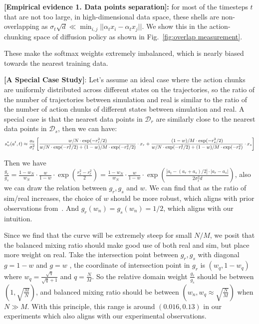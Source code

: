 \textbf{[Empirical evidence 1. Data points separation]:}
for most of the timesteps $t$ that are not too large, in high-dimensional data space,
these shells are non-overlapping as $\sigma_t\sqrt{d} \ll \min_{i,j} ||\alpha_t x_i - \alpha_t x_j||$.
We show this in the action-chunking space of diffusion policy as shown in Fig.~\ref{fig:overlap measurement}.

These make the softmax weights extremely imbalanced, which is nearly biased towards the nearest training data.

\textbf{[A Special Case Study]}: Let's assume an ideal case where the action chunks are uniformly distributed across different states on the trajectories, so the ratio of the number of trajectories between simulation and real is similar to the ratio of the number of action chunks of different states between simulation and real.  A special case is that the nearest data points in $\mathcal{D}_r$ are similarly close to the nearest data points in $\mathcal{D}_s$, then we can have:
\begin{equation}
\small
\begin{aligned}
    s_w^*(a^t, t) \approx \frac{\alpha_t}{\sigma_t^2}\left[ \frac{w/N\cdot \exp(-r_r^2/2)}{w/N\cdot \exp(-r_r^2/2)+(1-w)/M \cdot \exp(-r_s^2/2)}\cdot x_r  + \frac{(1-w)/M \cdot \exp(-r_s^2/2)}{w/N\cdot \exp(-r_r^2/2)+(1-w)/M\cdot \exp(-r_s^2)}\cdot x_s \right]
\end{aligned}
\end{equation}

Then we have $\frac{g_r}{g_s} = \frac{1-w_N}{w_N}\cdot \frac{w}{1-w} \cdot \exp(\frac{r_s^2 - r_r^2}{2}) = \frac{1-w_N}{w_N}\cdot \frac{w}{1-w} \cdot \exp (\frac{|a_t - (a_r+a_s)/2|\cdot|a_r-a_s|}{2\sigma_t^2d})$, also we can draw the relation between $g_r,g_s$ and $w$. We can find that as the ratio of sim/real increases, the choice of $w$ should be more robust, which aligns with prior observations from~\citet{wei2025empirical}. And $g_r(w_n)=g_s(w_n)=1/2$, which aligns with our intuition.

Since we find that the curve will be extremely steep for small $N/M$, we posit that the balanced mixing ratio should make good use of both real and sim, but place more weight on real. 
Take the intersection point between $g_r, g_s$ with diagonal $g=1-w$ and $g=w$ , the coordinate of intersection point in $g_r$ is $(w_q, 1-w_q)$ where $w_q=\frac{\sqrt{q}}{\sqrt{q}+1}$ and $q=\frac{N}{M}$.
So the relative domain weight $\frac{g_r}{g_s}$ should be between $(1, \sqrt{\frac{M}{N}})$,
and balanced mixing ratio should be between $(w_n, w_q\approx\sqrt{\frac{N}{M}})$ when $N\gg M$.
With this principle, this range is around $(0.016, 0.13)$ in our experiments which also aligns with our experimental observations.


